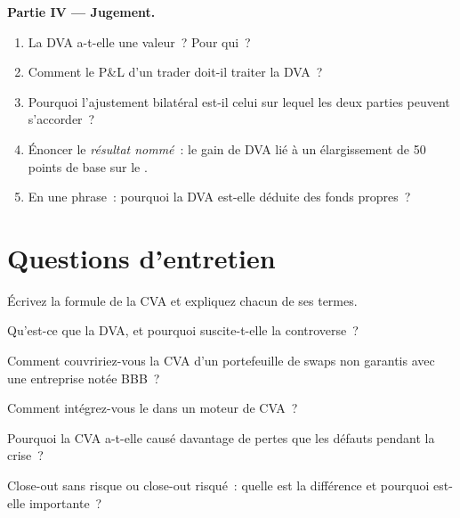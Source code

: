 \begin{problem}
\medskip\noindent\textbf{Partie IV --- Jugement.}
\begin{enumerate}[resume]
\item La DVA a-t-elle une valeur~? Pour qui~?
\item Comment le P\&L d'un trader doit-il traiter la DVA~?
\item Pourquoi l'ajustement bilatéral est-il celui sur lequel les deux parties peuvent s'accorder~?
\item Énoncer le \emph{résultat nommé}~: le gain de DVA lié à un élargissement de 50 points de base sur le
.
\item En une phrase~: pourquoi la DVA est-elle déduite des fonds propres~?
\end{enumerate}
\end{problem}

\section{Questions d'entretien}

\begin{interviewq}\label{iq:rc:credit-and-debit-valuation-adjustments:1}
Écrivez la formule de la CVA et expliquez chacun de ses termes.
\end{interviewq}

\begin{interviewq}\label{iq:rc:credit-and-debit-valuation-adjustments:2}
Qu'est-ce que la DVA, et pourquoi suscite-t-elle la controverse~?
\end{interviewq}

\begin{interviewq}\label{iq:rc:credit-and-debit-valuation-adjustments:3}
Comment couvririez-vous la CVA d'un portefeuille de swaps non garantis avec une entreprise notée BBB~?
\end{interviewq}

\begin{interviewq}\label{iq:rc:credit-and-debit-valuation-adjustments:4}
Comment intégrez-vous le  dans un moteur de CVA~?
\end{interviewq}

\begin{interviewq}\label{iq:rc:credit-and-debit-valuation-adjustments:5}
Pourquoi la CVA a-t-elle causé davantage de pertes que les défauts pendant la crise~?
\end{interviewq}

\begin{interviewq}\label{iq:rc:credit-and-debit-valuation-adjustments:6}
Close-out sans risque ou close-out risqué~: quelle est la différence et pourquoi est-elle importante~?
\end{interviewq}
